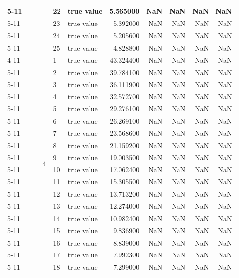 \begin{tabular}{llllllrrrrr}
\cline{5-11}
 &  &  &  & 22 & true value & 5.565000 & NaN & NaN & NaN & NaN \\
\cline{5-11}
 &  &  &  & 23 & true value & 5.392000 & NaN & NaN & NaN & NaN \\
\cline{5-11}
 &  &  &  & 24 & true value & 5.205600 & NaN & NaN & NaN & NaN \\
\cline{5-11}
 &  &  &  & 25 & true value & 4.828800 & NaN & NaN & NaN & NaN \\
\cline{4-11} \cline{5-11}
 &  &  & \multirow[t]{25}{*}{4} & 1 & true value & 43.324400 & NaN & NaN & NaN & NaN \\
\cline{5-11}
 &  &  &  & 2 & true value & 39.784100 & NaN & NaN & NaN & NaN \\
\cline{5-11}
 &  &  &  & 3 & true value & 36.111900 & NaN & NaN & NaN & NaN \\
\cline{5-11}
 &  &  &  & 4 & true value & 32.572700 & NaN & NaN & NaN & NaN \\
\cline{5-11}
 &  &  &  & 5 & true value & 29.276100 & NaN & NaN & NaN & NaN \\
\cline{5-11}
 &  &  &  & 6 & true value & 26.269100 & NaN & NaN & NaN & NaN \\
\cline{5-11}
 &  &  &  & 7 & true value & 23.568600 & NaN & NaN & NaN & NaN \\
\cline{5-11}
 &  &  &  & 8 & true value & 21.159200 & NaN & NaN & NaN & NaN \\
\cline{5-11}
 &  &  &  & 9 & true value & 19.003500 & NaN & NaN & NaN & NaN \\
\cline{5-11}
 &  &  &  & 10 & true value & 17.062400 & NaN & NaN & NaN & NaN \\
\cline{5-11}
 &  &  &  & 11 & true value & 15.305500 & NaN & NaN & NaN & NaN \\
\cline{5-11}
 &  &  &  & 12 & true value & 13.713200 & NaN & NaN & NaN & NaN \\
\cline{5-11}
 &  &  &  & 13 & true value & 12.274000 & NaN & NaN & NaN & NaN \\
\cline{5-11}
 &  &  &  & 14 & true value & 10.982400 & NaN & NaN & NaN & NaN \\
\cline{5-11}
 &  &  &  & 15 & true value & 9.836900 & NaN & NaN & NaN & NaN \\
\cline{5-11}
 &  &  &  & 16 & true value & 8.839000 & NaN & NaN & NaN & NaN \\
\cline{5-11}
 &  &  &  & 17 & true value & 7.992300 & NaN & NaN & NaN & NaN \\
\cline{5-11}
 &  &  &  & 18 & true value & 7.299000 & NaN & NaN & NaN & NaN \\

\end{tabular}
